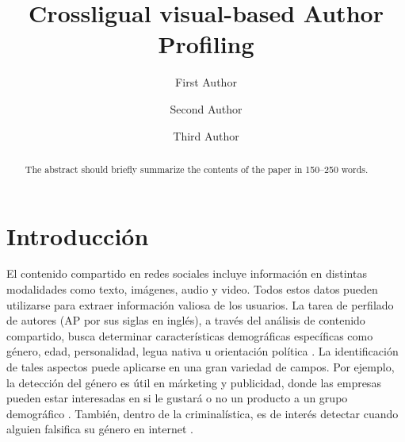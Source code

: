\documentclass[runningheads]{llncs}
\begin{document}
%
\title{Crossligual visual-based Author Profiling}


\author{First Author \and
Second Author \and
Third Author}
%
%

\maketitle

\begin{abstract}
The abstract should briefly summarize the contents of the paper in
150--250 words.

\end{abstract}

\section{Introducción}

El contenido compartido en redes sociales incluye información 
en distintas modalidades como texto, imágenes, audio y video.
Todos estos datos pueden utilizarse para extraer información
valiosa de los usuarios. 
La tarea de perfilado de autores (AP por sus siglas en inglés), a través
del análisis de contenido compartido, busca determinar características demográficas 
específicas como género, edad, personalidad, legua nativa u orientación 
política \cite{rangel_rosso_montes-y-gomez_potthast_stein}. La identificación de tales
aspectos puede aplicarse en una gran variedad de campos. Por ejemplo, la detección del
género es útil en márketing y publicidad, donde las empresas pueden estar interesadas
en si le gustará o no un producto a un grupo demográfico \cite{miller_dickinson_hu_2012}.
También, dentro de la criminalística, es de interés detectar cuando alguien falsifica su género en internet \cite{cheng_chandramouli_subbalakshmi_2011}. 
\end{document}
